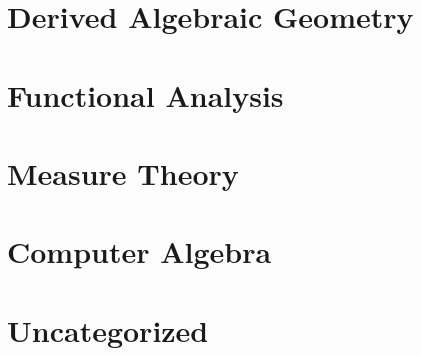 \documentclass{report}
\begin{document}
\chapter{Derived Algebraic Geometry}
\renewcommand{\cat}{DAG}


\chapter{Functional Analysis}
\renewcommand{\cat}{FA}


\chapter{Measure Theory}
\renewcommand{\cat}{MT}


\chapter{Computer Algebra}
\renewcommand{\cat}{CP}


\chapter{Uncategorized}
\renewcommand{\cat}{UN}


\end{document}
